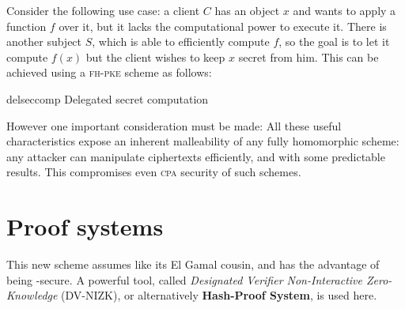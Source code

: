 Consider the following use case: a client $C$ has an object $x$ and wants to apply a function $f$ over it, but it lacks the computational power to execute it. There is another subject $S$, which is able to efficiently compute $f$, so the goal is to let it compute $f(x)$ but the client wishes to keep $x$ secret from him. This can be achieved using a \textsc{fh-pke} scheme as follows:


\begin{cryptosequence}
    {delseccomp}
    {Delegated secret computation}


    \cseqdelay


    \cseqdelay
    \cseqdelay


\end{cryptosequence}


However one important consideration must be made: All these useful characteristics expose an inherent malleability of any fully homomorphic scheme: any attacker can manipulate ciphertexts efficiently, and with some predictable results. This compromises even \textsc{cpa} security of such schemes.

\section{Proof systems}

This new scheme assumes \ddh{} like its El Gamal cousin, and has the advantage of being \cca-secure. A powerful tool, called \emph{Designated Verifier Non-Interactive Zero-Knowledge} (\textsc{DV-NIZK}), or alternatively \textbf{Hash-Proof System}, is used here.



